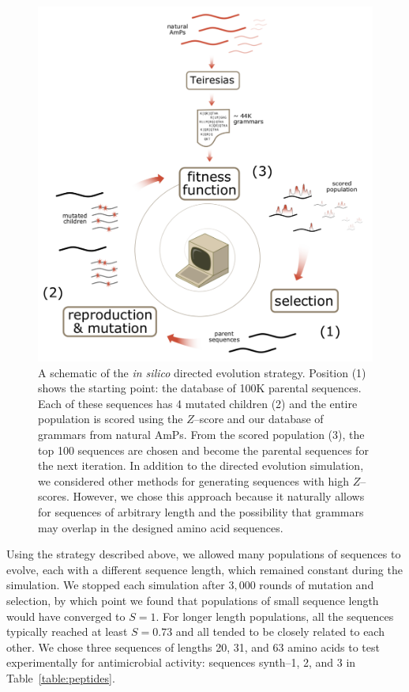         \begin{figure}
        \centering
        \includegraphics[width=\textwidth]{Body/Images-chap2/evolution.pdf}
        \caption[Directed evolution]{ A schematic of the \emph{in
        silico} directed evolution strategy.  Position (1)
        shows the starting point: the database of 100K parental
        sequences.  Each of these sequences has 4 mutated
        children (2) and the entire population is scored using the
        $Z$--score and our database of grammars from natural AmPs.
        From the scored population (3), the top 100 sequences
        are chosen and become the parental sequences for the
        next iteration.  In addition to the directed evolution
        simulation, we considered other methods for generating
        sequences with high $Z$--scores.  However, we chose this
        approach because it naturally allows for sequences of
        arbitrary length and the possibility that grammars may
        overlap in the designed amino acid sequences.}%
        \label{fig:evolution}
        \end{figure}

    Using the strategy described above, we allowed many populations
    of sequences to evolve, each with a different sequence length,
    which remained constant during the simulation.  We stopped each
    simulation after $3,000$ rounds of mutation and selection, by which
    point we found that populations of small sequence length would have
    converged to $S=1$.  For longer length populations, all the sequences
    typically reached at least $S=0.73$ and all tended to be closely
    related to each other.  We chose three sequences of lengths 20, 31,
    and 63 amino acids to test experimentally for antimicrobial activity:
    sequences synth--1, 2, and 3 in Table~\vref{table:peptides}.


